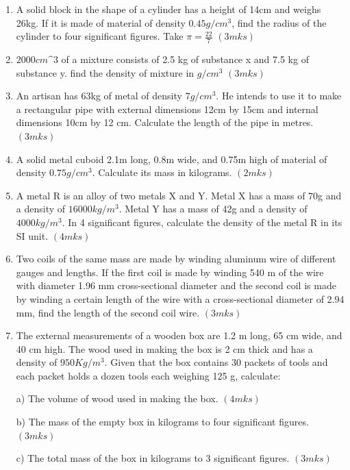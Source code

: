 \documentclass[
  a4paperpaper,
]{scrbook}
\begin{document}
\begin{tcolorbox}
\begin{enumerate}
\def\labelenumi{\arabic{enumi}.}
\item
  A solid block in the shape of a cylinder has a height of 14cm and
  weighs 26kg. If it is made of material of density \(0.45g/cm^3\), find
  the radius of the cylinder to four significant figures. Take
  \(\pi=\frac{22}{7}\) \hspace{13.7 cm} \((3mks)\)
\item
  \(2000 cm\^3\) of a mixture consists of 2.5 kg of substance x and 7.5
  kg of substance y. find the density of mixture in \(g/cm^3\)
  \hspace{11 cm} \((3mks)\)
\item
  An artisan has 63kg of metal of density \(7g/cm^3\). He intends to use
  it to make a rectangular pipe with external dimensions 12cm by 15cm
  and internal dimensions 10cm by 12 cm. Calculate the length of the
  pipe in metres. \hspace{9.8 cm} \((3mks)\)
\item
  A solid metal cuboid 2.1m long, 0.8m wide, and 0.75m high of material
  of density \(0.75g/cm^3\). Calculate its mass in kilograms.
  \hspace{8.8 cm} \((2mks)\)
\item
  A metal R is an alloy of two metals X and Y. Metal X has a mass of 70g
  and a density of \(16000kg/m^3\). Metal Y has a mass of 42g and a
  density of \(4000 kg/m^3\). In 4 significant figures, calculate the
  density of the metal R in its SI unit. \hspace{6cm} \((4mks)\)
\item
  Two coils of the same mass are made by winding aluminum wire of
  different gauges and lengths. If the first coil is made by winding 540
  m of the wire with diameter 1.96 mm cross-sectional diameter and the
  second coil is made by winding a certain length of the wire with a
  cross-sectional diameter of 2.94 mm, find the length of the second
  coil wire. \hspace{4.3cm} \((3mks)\)
\item
  The external measurements of a wooden box are 1.2 m long, 65 cm wide,
  and 40 cm high. The wood used in making the box is 2 cm thick and has
  a density of \(950 Kg/m^3\). Given that the box contains 30 packets of
  tools and each packet holds a dozen tools each weighing 125 g,
  calculate:

  a) The volume of wood used in making the box. \hspace{6cm} \((4mks)\)

  b) The mass of the empty box in kilograms to four significant figures.
  \hspace{3cm}\((3mks)\)

  c) The total mass of the box in kilograms to 3 significant figures.
  \hspace{3.8cm}\((3mks)\)
\end{enumerate}

\end{tcolorbox}
\end{document}
